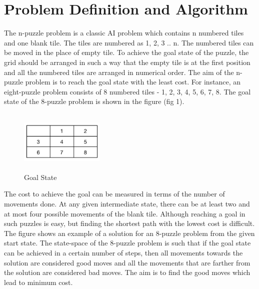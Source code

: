 \documentclass{svproc}
\begin{document}
\section{Problem Definition and Algorithm}
\noindent The n-puzzle problem is a classic AI problem which contains n numbered tiles and one blank tile. The tiles are numbered as 1, 2, 3 .. n. The numbered tiles can be moved in the place of empty tile. To achieve the goal state of the puzzle, the grid should be arranged in such a way that the empty tile is at the first position and all the numbered tiles are arranged in numerical order. The aim of the n-puzzle problem is to reach the goal state with the least cost. For instance, an eight-puzzle problem consists of 8 numbered tiles - 1, 2, 3, 4, 5, 6, 7, 8. The goal state of the 8-puzzle problem is shown in the figure (fig 1). \\

\begin{figure}
	\centering
	\includegraphics[width=4cm,height=3cm,keepaspectratio]{GoalState.png}
	\caption{Goal State}
	\label{fig:1}
\end{figure}


\noindent The cost to achieve the goal can be measured in terms of the number of movements done. At any given intermediate state, there can be at least two and at most four possible movements of the blank tile. Although reaching a goal in such puzzles is easy, but finding the shortest path with the lowest cost is difficult. The figure shows an example of a solution for an 8-puzzle problem from the given start state. The state-space of the 8-puzzle problem is such that if the goal state can be achieved in a certain number of steps, then all movements towards the solution are considered good moves and all the movements that are farther from the solution are considered bad moves. The aim is to find the good moves which lead to minimum cost. \\
\end{document}
